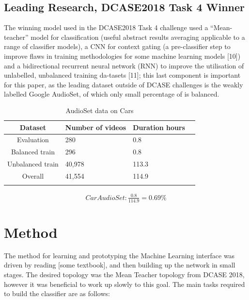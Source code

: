\documentclass{UoNMCHA}
\numberwithin{equation}{section}
\begin{document}
\subsection{Leading Research, DCASE2018 Task 4 Winner}
The winning model used in the DCASE2018 Task 4 challenge used a “Mean-teacher” model for classification (useful abstract results averaging applicable to a range of classifier models), a CNN for context gating (a pre-classifier step to improve flaws in training methodologies for some machine learning models [10]) and a bidirectional recurrent neural network (RNN) to improve the utilisation of unlabelled, unbalanced training da-tasets [11]; this last component is important for this paper, as the leading dataset outside of DCASE challenges is the weakly labelled Google AudioSet, of which only small percentage of is balanced.

\begin{table}[h!]
    \begin{center}
        \caption{AudioSet data on Cars}\label{tab:AudioSetCars}
        {\footnotesize
            \begin{tabular}{c l l l|}
                \hline\hline Dataset & Number of videos & Duration hours \\ \hline 
                Evaluation & 280 & 0.8 \\
                Balanced train & 296 & 0.8 \\
                Unbalanced train & 40,978 & 113.3 \\
                Overall & 41,554 & 114.9 \\
                \\ \hline
            \end{tabular}
        }
    \end{center}
\end{table}
\begin{gather*}
    Car AudioSet:  \frac{0.8}{114.9}=0.69\%
\end{gather*}

\section{Method}
The method for learning and prototyping the Machine Learning interface was driven by reading [some textbook], and then building up the network in small stages. The desired topology was the Mean Teacher topology from DCASE 2018, however it was beneficial to work up slowly to this goal.  The main tasks required to build the classifier are as follows:
\end{document}
